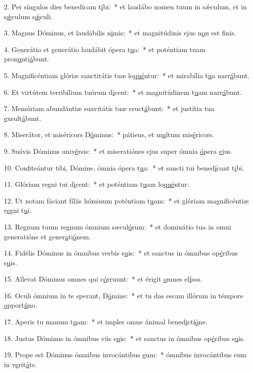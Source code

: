 2. Per síngulos dies benedícam t\uline{i}bi:~* et laudábo nomen tuum in sǽculum, et in s\uline{ǽ}culum s\uline{ǽ}culi.\par 
3. Magnus Dóminus, et laudábilis n\uline{i}mis:~* et magnitúdinis ejus n\uline{o}n est f\uline{i}nis.\par 
4. Generátio et generátio laudábit ópera t\uline{u}a:~* et poténtiam tuam pron\uline{u}nti\uline{á}bunt.\par 
5. Magnificéntiam glóriæ sanctitátis tuæ lo\uline{qué}ntur:~* et mirabília t\uline{u}a narr\uline{á}bunt.\par 
6. Et virtútem terribílium tuórum d\uline{i}cent:~* et magnitúdinem t\uline{u}am narr\uline{á}bunt.\par 
7. Memóriam abundántiæ suavitátis tuæ eruct\uline{á}bunt:~* et justítia tua \uline{e}xsult\uline{á}bunt.\par 
8. Miserátor, et miséricors D\uline{ó}minus:~* pátiens, et m\uline{u}ltum mis\uline{é}ricors.\par 
9. Suávis Dóminus univ\uline{é}rsis:~* et miseratiónes ejus super ómnia \uline{ó}pera \uline{e}jus.\par 
10. Confiteántur tibi, Dómine, ómnia ópera t\uline{u}a:~* et sancti tui bened\uline{í}cant t\uline{i}bi.\par 
11. Glóriam regni tui d\uline{i}cent:~* et poténtiam t\uline{u}am lo\uline{qué}ntur:\par 
12. Ut notam fáciant fíliis hóminum poténtiam t\uline{u}am:~* et glóriam magnificéntiæ r\uline{e}gni t\uline{u}i.\par 
13. Regnum tuum regnum ómnium sæcul\uline{ó}rum:~* et dominátio tua in omni generatióne et gener\uline{a}ti\uline{ó}nem.\par 
14. Fidélis Dóminus in ómnibus verbis s\uline{u}is:~* et sanctus in ómnibus op\uline{é}ribus s\uline{u}is.\par 
15. Allevat Dóminus omnes qui c\uline{ó}rruunt:~* et érigit \uline{o}mnes el\uline{í}sos.\par 
16. Oculi ómnium in te sperant, D\uline{ó}mine:~* et tu das escam illórum in témpore \uline{o}pport\uline{ú}no.\par 
17. Aperis tu manum t\uline{u}am:~* et imples omne ánimal bened\uline{i}cti\uline{ó}ne.\par 
18. Justus Dóminus in ómnibus viis s\uline{u}is:~* et sanctus in ómnibus op\uline{é}ribus s\uline{u}is.\par 
19. Prope est Dóminus ómnibus invocántibus \uline{e}um:~* ómnibus invocántibus eum in v\uline{e}rit\uline{á}te.\par 
